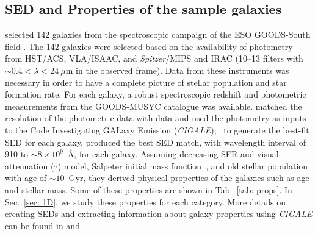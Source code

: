  \subsection{SED and Properties of the sample galaxies} 
     selected 142 galaxies from the spectroscopic campaign of the ESO GOODS-South field \citep{}. %
    The 142 galaxies were selected based on the availability of photometry from HST/ACS, VLA/ISAAC, and {\it Spitzer}/MIPS and IRAC (10--13 filters with $\sim 0.4<\lambda<24~\mu$m in the observed frame).
   Data from these instruments was necessary in order to have a complete picture of stellar population and star formation rate. 
    For each galaxy, a robust spectroscopic redshift and photometric measurements from the GOODS-MUSYC catalogue \citep{} was available. %
    matched the resolution of the photometric data with  data %
and used the photometry as inputs to the Code Investigating GALaxy Emission ({\em CIGALE});~\citep[][hereafter N09]{Noll09} to generate the best-fit SED for each galaxy.%
     produced the best SED match, with wavelength interval of 910 to $\sim 8\times10^9$~\AA, for each galaxy. %
    Assuming decreasing SFR and visual attenuation ($\tau$) model, Salpeter initial mass function~\citep{Salpeter55}, and old stellar population with age of $\sim 10$~Gyr, they derived physical properties of the galaxies such as age and stellar mass.
    Some of these properties are shown in Tab.~\ref{tab: props}.
    In Sec.~\ref{sec: 1D}, we study these properties for each category.
    More details on creating SEDs and extracting information about galaxy properties using {\em CIGALE} can be found in  and .
    
